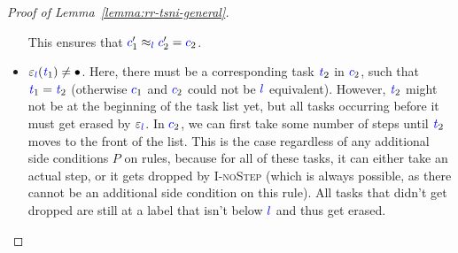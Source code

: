 \documentclass{sigplanconf}
\newcommand{\Varid}[1]{\mathit{#1}}
\newcommand{\alphacondition}[1]{{\color{green}Condition for $\alpha$: #1}}
\begin{document}
\begin{proof}[Proof of Lemma~\ref{lemma:rr-tsni-general}]
\begin{itemize}
    This ensures that ${\color{blue} c}_{1}'\approx_{{\color{blue} l}}{\color{blue} c}_{2}'={\color{blue} c}_{2}$.
    \item $\ensuremath{\varepsilon_{\ifc{l}}(\ifc{\Varid{t}}_{1})}\neq\ensuremath{\bullet}$.
    Here, there must be a corresponding
    task \ensuremath{\ifc{\Varid{t}}_{2}} in \ensuremath{\ifc{c}_{2}},
    such that \ensuremath{\ifc{\Varid{t}}_{1}\mathrel{=}\ifc{\Varid{t}}_{2}} (otherwise \ensuremath{\ifc{c}_{1}} and
    \ensuremath{\ifc{c}_{2}} could not be \ensuremath{\ifc{l}} equivalent).
    However, \ensuremath{\ifc{\Varid{t}}_{2}} might not be at the beginning of the task list yet, but
    all tasks occurring before it must get erased by \ensuremath{\varepsilon_{\ifc{l}}}.
    In \ensuremath{\ifc{c}_{2}}, we can first take some number of steps until \ensuremath{\ifc{\Varid{t}}_{2}} moves
    to the front of the list.
    This is the case regardless of any additional side conditions $P$ on
    rules, because for all of these tasks, it can either take an actual
    step, or it gets dropped by \textsc{I-noStep} (which is always
    possible, as there cannot be an additional side condition on this
    rule).  All tasks that didn't get dropped are still at a label
    that isn't below \ensuremath{\ifc{l}} and thus get erased.
    
    

\end{itemize}
\end{proof}
\end{document}
